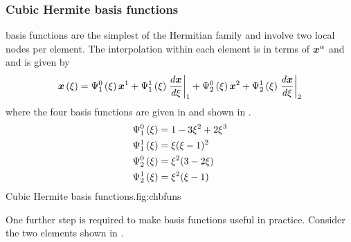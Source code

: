 \subsubsection{Cubic Hermite basis functions}

\Cubicherm basis functions are the simplest of the Hermitian family and
involve two local nodes per element. The interpolation within each element is
in terms of $\nodept{\vect{x}}{\alpha}$ and 
and is given by 
\begin{equation}
  \fnof{\vect{x}}{\xi}=\chbfn{1}{0}{\xi}\nodept{\vect{x}}{1}+\chbfn{1}{1}{\xi}
  \evalat{\dby{\vect{x}}{\xi}}{1}+\chbfn{2}{0}{\xi}\nodept{\vect{x}}{2}+
  \chbfn{2}{1}{\xi}\evalat{\dby{\vect{x}}{\xi}}{2}
  \label{eqn:chxiinterpolation}
\end{equation}
where the four \onedal \cubicherm basis functions are given in 
 and shown in .
\begin{equation}
  \begin{split}
       \Psi_{1}^{0} \left( \xi \right)   &= 1-3\xi^{2}+2\xi^{3} \\
       \Psi_{1}^{1} \left( \xi \right)   &= \xi(\xi-1)^{2} \\
       \Psi_{2}^{0} \left( \xi \right)   &= \xi^{2}(3-2\xi) \\
       \Psi_{2}^{1} \left( \xi \right)   &= \xi^{2}(\xi-1) 
  \end{split}
  \label{eqn:chbfuns}
\end{equation}
{Cubic Hermite basis functions.}{fig:chbfuns}

One further step is required to make \cubicherm basis functions useful in
practice.  Consider the two \cubicherm elements shown in
.



